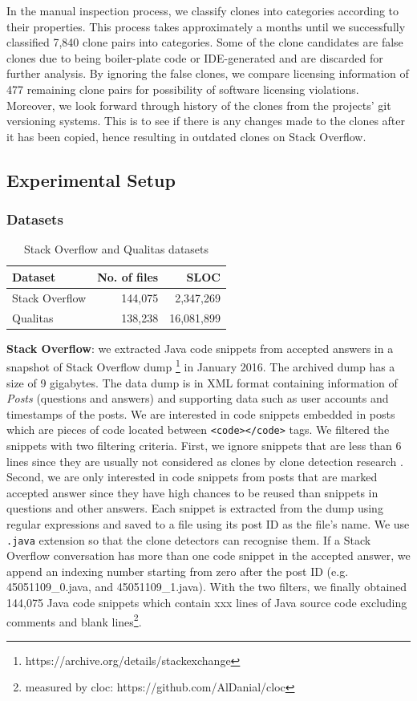 \documentclass{sig-alternate-05-2015}
\begin{document}
In the manual inspection process, we classify clones into categories according to their properties. This process takes approximately a months until we successfully classified 7,840 clone pairs into categories. Some of the clone candidates are false clones due to being boiler-plate code or IDE-generated and are discarded for further analysis. By ignoring the false clones, we compare licensing information of 477 remaining clone pairs for possibility of software licensing violations. Moreover, we look forward through history of the clones from the projects' git versioning systems. This is to see if there is any changes made to the clones after it has been copied, hence resulting in outdated clones on Stack Overflow.

\subsection{Experimental Setup}

\subsubsection{Datasets}
\begin{table}
	\centering
	\caption{Stack Overflow and Qualitas datasets}
	\label{tab:datasets}
	\small
	\begin{tabular}{l|r|r}
		\hline 
		Dataset & No. of files & SLOC \\
		\hline
		Stack Overflow & 144,075 & 2,347,269 \\ 
		\hline 
		Qualitas &  138,238 & 16,081,899 \\ 
		\hline 
	\end{tabular} 
\end{table}

\textbf{Stack Overflow}: we extracted Java code snippets from accepted answers in a snapshot of Stack Overflow dump \footnote{https://archive.org/details/stackexchange} in January 2016. The archived dump has a size of 9 gigabytes. The data dump is in XML format containing information of \textit{Posts} (questions and answers) and supporting data such as user accounts and timestamps of the posts. We are interested in code snippets embedded in posts which are pieces of code located between \texttt{<code></code>} tags. We filtered the snippets with two filtering criteria. First, we ignore snippets that are less than 6 lines since they are usually not considered as clones by clone detection research \cite{something}. Second, we are only interested in code snippets from posts that are marked accepted answer since they have high chances to be reused than snippets in questions and other answers. Each snippet is extracted from the dump using regular expressions and saved to a file using its post ID as the file's name. We use \texttt{.java} extension so that the clone detectors can recognise them. If a Stack Overflow conversation has more than one code snippet in the accepted answer, we append an indexing number starting from zero after the post ID (e.g. 45051109\_0.java, and 45051109\_1.java). With the two filters, we finally obtained 144,075 Java code snippets which contain xxx lines of Java source code excluding comments and blank lines\footnote{measured by cloc: https://github.com/AlDanial/cloc}.
\end{document}
